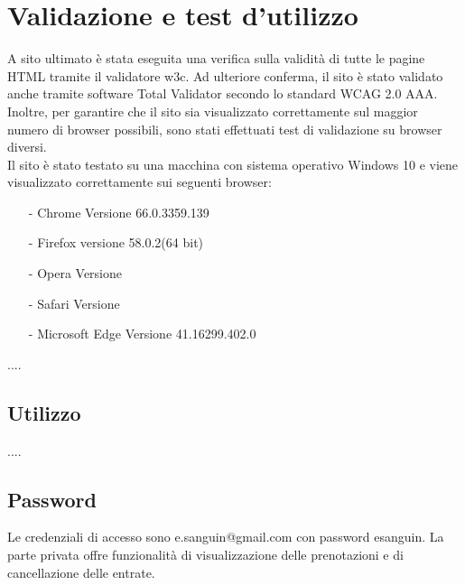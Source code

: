 \section{Validazione e test d'utilizzo}
A sito ultimato è stata eseguita una verifica sulla validità di tutte le pagine HTML tramite il validatore w3c. Ad ulteriore conferma, il sito è stato validato anche tramite software Total Validator secondo lo standard WCAG 2.0 AAA.
Inoltre, per garantire che il sito sia visualizzato correttamente sul maggior numero di browser possibili, sono stati effettuati test di validazione su browser diversi.
\\
Il sito è stato testato su una macchina con sistema operativo Windows 10 e viene visualizzato correttamente sui seguenti browser:
\begin{itemize}
	\item [-] Chrome Versione 66.0.3359.139
	\item [-] Firefox versione 58.0.2(64 bit)
	\item [-] Opera Versione 
	\item [-] Safari Versione
	\item [-] Microsoft Edge Versione 41.16299.402.0
\end{itemize}
....
\subsection{Utilizzo}
....
\subsection{Password}
Le credenziali di accesso sono  e.sanguin@gmail.com  con password esanguin. La parte privata offre funzionalità di visualizzazione delle prenotazioni e di cancellazione delle entrate. 
